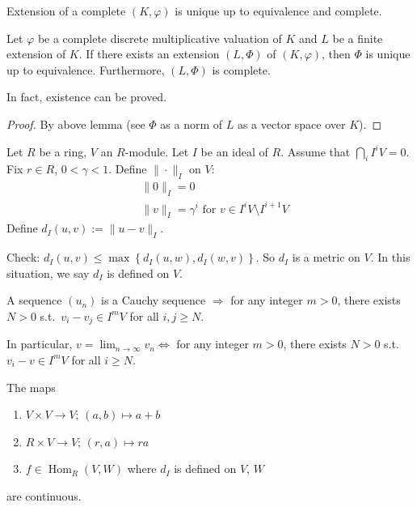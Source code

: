 \documentclass[11pt, a4paper]{report}
\begin{document}
\begin{theorem}
Extension of a complete $(K, \varphi)$ is unique up to equivalence and complete.
\end{theorem}
\begin{theorem}
Let $\varphi$ be a complete discrete multiplicative valuation of $K$ and $L$ be a finite extension of $K$. If there exists an extension $(L, \Phi)$ of $(K, \varphi)$, then $\Phi$ is unique up to equivalence. Furthermore, $(L, \Phi)$ is complete.
\end{theorem}

\begin{remark}
In fact, existence can be proved.
\end{remark}

\begin{proof}
By above lemma (see $\Phi$ as a norm of $L$ as a vector space over $K$).
\end{proof}

\begin{definition}
Let $R$ be a ring, $V$ an $R$-module. Let $I$ be an ideal of $R$. Assume that $\bigcap_{i} I^{i} V = 0$. Fix $r \in R$, $0 < \gamma < 1$. Define $\|\cdot\|_{I}$ on $V$:
\[
\begin{aligned}
& \|0\|_{I} = 0 \\
& \|v\|_{I} = \gamma^{i} \text{ for } v \in I^{i} V \setminus I^{i+1} V
\end{aligned}
\]
Define $d_{I}(u, v) := \|u - v\|_{I}$.

Check: $d_{I}(u, v) \leq \max \left\{d_{I}(u, w), d_{I}(w, v)\right\}$. So $d_{I}$ is a metric on $V$. In this situation, we say $d_{I}$ is defined on $V$.

A sequence $(u_{n})$ is a Cauchy sequence $\Rightarrow$ for any integer $m > 0$, there exists $N > 0$ s.t.\ $v_{i} - v_{j} \in I^{m} V$ for all $i, j \geqslant N$.

In particular, $v = \lim_{n \rightarrow \infty} v_{n} \Leftrightarrow$ for any integer $m > 0$, there exists $N > 0$ s.t.\ $v_{i} - v \in I^{m} V$ for all $i \geqslant N$.

The maps
\begin{enumerate}
\item $V \times V \rightarrow V;\, (a, b) \mapsto a + b$
\item $R \times V \rightarrow V;\, (r, a) \mapsto ra$
\item $f \in \operatorname{Hom}_{R}(V, W)$ where $d_{I}$ is defined on $V$, $W$
\end{enumerate}
are continuous.
\end{definition}
\end{document}
